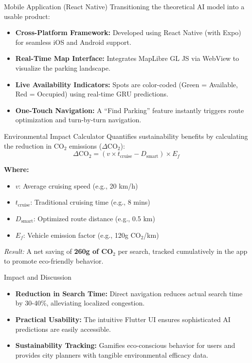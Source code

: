 \documentclass{beamer}
\begin{document}
\begin{frame}{Mobile Application (React Native)}
  Transitioning the theoretical AI model into a usable product:
  \vspace{0.5cm}
  \begin{itemize}
      \item \textbf{Cross-Platform Framework:} Developed using React Native (with Expo) for seamless iOS and Android support.
      \item \textbf{Real-Time Map Interface:} Integrates MapLibre GL JS via WebView to visualize the parking landscape.
      \item \textbf{Live Availability Indicators:} Spots are color-coded (Green = Available, Red = Occupied) using real-time GRU predictions.
      \item \textbf{One-Touch Navigation:} A ``Find Parking'' feature instantly triggers route optimization and turn-by-turn navigation.
  \end{itemize}
\end{frame}

\begin{frame}{Environmental Impact Calculator}
  Quantifies sustainability benefits by calculating the reduction in CO$_2$ emissions ($\Delta \text{CO}_2$):
  \begin{equation*}
      \Delta \text{CO}_2 = (v \times t_{\text{cruise}} - D_{\text{smart}}) \times E_f
  \end{equation*}
  
  \textbf{Where:}
  \begin{itemize}
      \item $v$: Average cruising speed (e.g., 20 km/h)
      \item $t_{\text{cruise}}$: Traditional cruising time (e.g., 8 mins)
      \item $D_{\text{smart}}$: Optimized route distance (e.g., 0.5 km)
      \item $E_f$: Vehicle emission factor (e.g., 120g CO$_2$/km)
  \end{itemize}
  
  \vspace{0.2cm}
  \textit{Result:} A net saving of \textbf{260g of CO$_2$} per search, tracked cumulatively in the app to promote eco-friendly behavior.
\end{frame}

\begin{frame}{Impact and Discussion}
  \begin{itemize}
      \item \textbf{Reduction in Search Time:} Direct navigation reduces actual search time by 30-40\%, alleviating localized congestion.
      \item \textbf{Practical Usability:} The intuitive Flutter UI ensures sophisticated AI predictions are easily accessible.
      \item \textbf{Sustainability Tracking:} Gamifies eco-conscious behavior for users and provides city planners with tangible environmental efficacy data.
  \end{itemize}
\end{frame}
\end{document}
